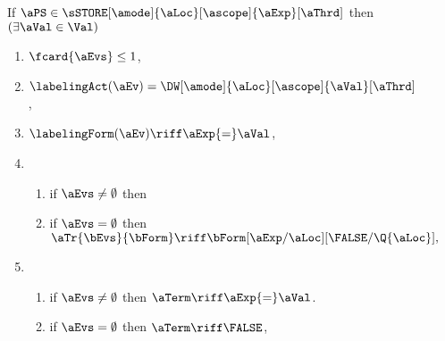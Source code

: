 \begin{figure}
  \noindent
  If $\aPS \in \sSTORE[\amode]{\aLoc}[\ascope]{\aExp}[\aThrd]$ then
  $(\exists\aVal\in\Val)$
  \begin{multicols}{2}
    \begin{enumerate}[topsep=0pt,label=(\textsc{w}\arabic*),ref=\textsc{w}\arabic*]
    \item \label{write-E}
      $\fcard{\aEvs}\leq1$,
    \item \label{write-lambda}
      $\labelingAct(\aEv) = \DW[\amode]{\aLoc}[\ascope]{\aVal}[\aThrd]$,
    \item \label{write-kappa}
      \begin{math}
        \labelingForm(\aEv) \riff
        \aExp{=}\aVal
      \end{math},    
    \item[] 
      \begin{enumerate}[leftmargin=0pt]
      \item \label{write-tau-nonempty}
        if $\aEvs\neq\emptyset$ then 
        \makebox[0cm][l]{%
        \begin{math}
          \aTr{\bEvs}{\bForm} \riff 
          \bForm
          [\aExp/\aLoc][\aExp{=}\aVal/\Q{\aLoc}],
        \end{math}}
      \item \label{write-tau-empty}
        if $\aEvs=\emptyset$ then 
        \begin{math}
          \aTr{\bEvs}{\bForm} \riff 
          \bForm
          [\aExp/\aLoc][\FALSE/\Q{\aLoc}],
        \end{math}
      \end{enumerate}
    \item[] \setcounter{enumi}{\value{term}} 
      \begin{enumerate}[leftmargin=0pt]
      \item \label{write-term-nonempty}
        if $\aEvs\neq\emptyset$ then $\aTerm \riff \aExp{=}\aVal$.
      \item \label{write-term-empty}
        if $\aEvs=\emptyset$ then $\aTerm \riff \FALSE$,
      \end{enumerate}
    \end{enumerate}
  \end{multicols}
  \medskip
  

\end{figure}

